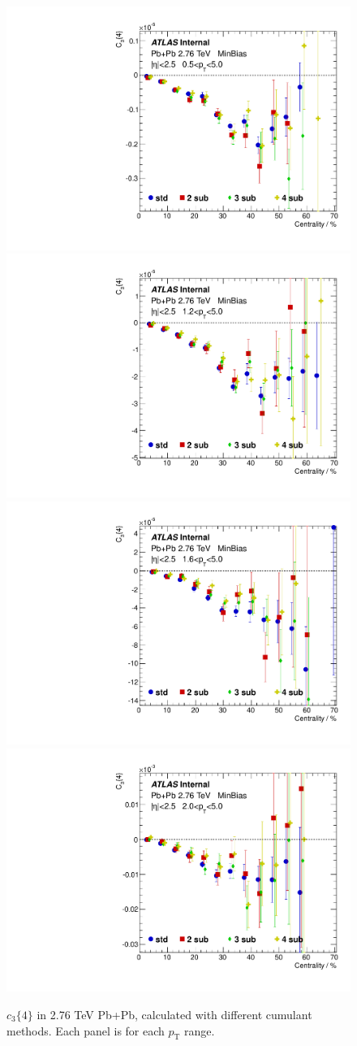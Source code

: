 \begin{figure}[H]
\centering
\includegraphics[width=.245\linewidth]{figs/sec_appendix/PbPb276/PbPb276_mtd_Har3_Pt0.pdf}
\includegraphics[width=.245\linewidth]{figs/sec_appendix/PbPb276/PbPb276_mtd_Har3_Pt2.pdf}
\includegraphics[width=.245\linewidth]{figs/sec_appendix/PbPb276/PbPb276_mtd_Har3_Pt4.pdf}
\includegraphics[width=.245\linewidth]{figs/sec_appendix/PbPb276/PbPb276_mtd_Har3_Pt6.pdf}
\caption{$c_3\{4\}$ in 2.76 TeV Pb+Pb, calculated with different cumulant methods. Each panel is for each $p_\text{T}$ range.}
\label{fig:PbPb276_mtd_v3}
\end{figure}

